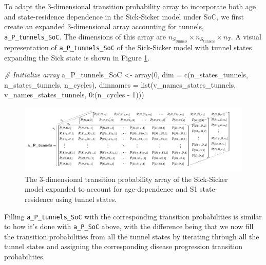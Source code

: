 \documentclass[
]{article}
\newenvironment{Shaded}{\begin{snugshade}}{\end{snugshade}}
\newcommand{\AttributeTok}[1]{\textcolor[rgb]{0.77,0.63,0.00}{#1}}
\newcommand{\CommentTok}[1]{\textcolor[rgb]{0.56,0.35,0.01}{\textit{#1}}}
\newcommand{\DecValTok}[1]{\textcolor[rgb]{0.00,0.00,0.81}{#1}}
\newcommand{\FunctionTok}[1]{\textcolor[rgb]{0.00,0.00,0.00}{#1}}
\newcommand{\NormalTok}[1]{#1}
\newcommand{\OtherTok}[1]{\textcolor[rgb]{0.56,0.35,0.01}{#1}}
\newcommand{\SpecialCharTok}[1]{\textcolor[rgb]{0.00,0.00,0.00}{#1}}
\begin{document}
To adapt the 3-dimensional transition probability array to incorporate both age and state-residence dependence in the Sick-Sicker model under SoC, we first create an expanded 3-dimensional array accounting for tunnels, \texttt{a\_P\_tunnels\_SoC}. The dimensions of this array are \(n_{S_{\text{tunnels}}} \times n_{S_{\text{tunnels}}} \times n_T\). A visual representation of \texttt{a\_P\_tunnels\_SoC} of the Sick-Sicker model with tunnel states expanding the Sick state is shown in Figure \ref{fig:Array-Time-Dependent-Tunnels}.

\begin{Shaded}
\begin{Highlighting}[]
\CommentTok{\# Initialize array}
\NormalTok{a\_P\_tunnels\_SoC }\OtherTok{\textless{}{-}} \FunctionTok{array}\NormalTok{(}\DecValTok{0}\NormalTok{, }\AttributeTok{dim =} \FunctionTok{c}\NormalTok{(n\_states\_tunnels, n\_states\_tunnels, n\_cycles),}
                         \AttributeTok{dimnames =} \FunctionTok{list}\NormalTok{(v\_names\_states\_tunnels, }
\NormalTok{                                         v\_names\_states\_tunnels, }
                                         \DecValTok{0}\SpecialCharTok{:}\NormalTok{(n\_cycles }\SpecialCharTok{{-}} \DecValTok{1}\NormalTok{)))}
\end{Highlighting}
\end{Shaded}

\begin{figure}[H]

{\centering \includegraphics[width=1\linewidth]{figs/3D-state-transition-array-sick-sicker-tunnels} 

}

\caption{The 3-dimensional transition probability array of the Sick-Sicker model expanded to account for age-dependence and S1 state-residence using tunnel states.}\label{fig:Array-Time-Dependent-Tunnels}
\end{figure}

Filling \texttt{a\_P\_tunnels\_SoC} with the corresponding transition probabilities is similar to how it's done with \texttt{a\_P\_SoC} above, with the difference being that we now fill the transition probabilities from all the tunnel states by iterating through all the tunnel states and assigning the corresponding disease progression transition probabilities.
\end{document}
